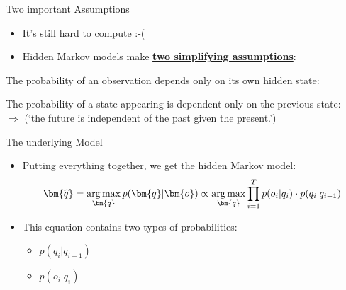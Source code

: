 \begin{frame}{Two important Assumptions}{}
	\begin{itemize}
		\item It's still hard to compute :-(
		\item Hidden Markov models make \textbf{\underline{two simplifying assumptions}}:
	\end{itemize}
	
	\footnotesize
	\begin{boxBlueNoFrame}
		 The probability of an observation depends only on its own hidden state:
	\end{boxBlueNoFrame}

	\begin{boxBlueNoFrame}
		 The probability of a state appearing is dependent only on the previous state:
			\highlight{$p(\bm{q}) \approx \prod_{1=1}^T p(q_i \vert q_{i-1})$} \\
			$\Rightarrow$  (`the future is independent of the past given the present.')
	\end{boxBlueNoFrame}
\end{frame}


\begin{frame}{The underlying Model}{}
	\begin{itemize}
		\item Putting everything together, we get the hidden Markov model:
		\begin{equation}
			\bm{\widehat{q}} = \argmax_{\bm{q}} p(\bm{q} \vert \bm{o}) \propto
				\argmax_{\bm{q}} \prod_{i=1}^T p(o_i \vert q_i) \cdot p(q_i \vert q_{i-1})
		\end{equation}
		\item This equation contains two types of probabilities:
		\begin{itemize}
			\item {} $p(q_i \vert q_{i-1})$
			\item {} $p(o_i \vert q_i)$
		\end{itemize}
	\end{itemize}
\end{frame}


